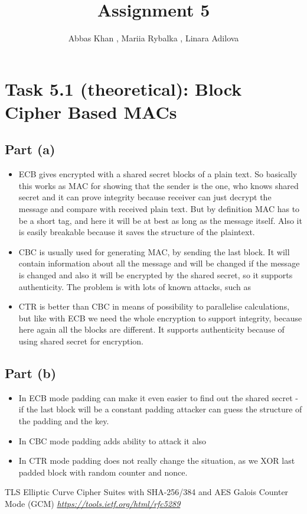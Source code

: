 \documentclass{article}
\title{Assignment 5}
\author{Abbas Khan , Mariia Rybalka , Linara Adilova}
\begin{document}
\maketitle 

\section*{Task 5.1 (theoretical): Block Cipher Based MACs}
\subsection*{Part (a)}
\begin{itemize}
\item ECB gives encrypted with a shared secret blocks of a plain text. So basically this works as MAC for showing that the sender is the one, who knows shared secret and it can prove integrity because receiver can just decrypt the message and compare with received plain text. But by definition MAC has to be a short tag, and here it will be at best as long as the message itself. Also it is easily breakable because it saves the structure of the plaintext.
\item CBC is usually used for generating MAC, by sending the last block. It will contain information about all the message and will be changed if the message is changed and also it will be encrypted by the shared secret, so it supports authenticity. The problem is with lots of known attacks, such as 
\item CTR is better than CBC in means of possibility to parallelise calculations, but like with ECB we need the whole encryption to support integrity, because here again all the blocks are different. It supports authenticity  because of using shared secret for encryption. 
\end{itemize}
\subsection*{Part (b)}
\begin{itemize}
\item In ECB mode padding can make it even easier to find out the shared secret - if the last block will be a constant padding attacker can guess the structure of the padding and the key.
\item In CBC mode padding adds ability to attack it also
\item In CTR mode padding does not really change the situation, as we XOR last padded block with random counter and nonce.
\end{itemize}

\cite{tls-ref}

\begin{thebibliography}{9}

  TLS Elliptic Curve Cipher Suites with SHA-256/384 and AES Galois Counter Mode (GCM)
  \emph{\url{https://tools.ietf.org/html/rfc5289}}
    
\end{thebibliography}
\end{document}
